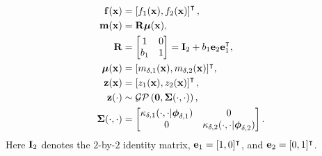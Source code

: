 \documentclass[journal ]{new-aiaa}
\begin{document}
	\begin{subequations}\label{eqn10}
		\begin{align}
			{\bf f}({\bf x}) &= \left[f_1({\bf x}),f_2({\bf x})\right]^\intercal 
			\label{eqn10-1},\\
			{\bf m}({\bf x}) &= {\bf R} \boldsymbol{\mu}({\bf x}), \label{eqn10-2}\\
			{\bf R} &= \left[\begin{matrix}
				1 & 0 \\
				b_1 & 1
			\end{matrix}\right] = {\bf I}_2 + b_1 {\bf e}_2 {\bf e}^\intercal_1, \label{eqn10-3}\\
			\boldsymbol{\mu}({\bf x}) & = [m_{\delta,1}({\bf x}),m_{\delta,2}({\bf x})]^\intercal,
			\label{eqn10-4}\\
			{\bf z}({\bf x}) & = \left[z_1({\bf x}),z_2({\bf x})\right]^\intercal, \label{eqn10-5}\\
			{\bf z}(\cdot) & \sim \mathcal{GP}\left({\bf 0},{\boldsymbol \Sigma}(\cdot,\cdot)\right),
			\label{eqn10-6}\\
			{\boldsymbol \Sigma}(\cdot,\cdot) & = \left[\begin{matrix}
				\kappa_{\delta,1}(\cdot,\cdot|{\boldsymbol \phi}_{\delta,1}) & 0 \\
				0 & \kappa_{\delta,2}(\cdot,\cdot|{\boldsymbol \phi}_{\delta,2})
			\end{matrix}\right] \label{eqn10-7}.
		\end{align}
	\end{subequations}
	Here ${\bf I}_2$ denotes the $2$-by-$2$ identity matrix, ${\bf e}_1 = [1,0]^\intercal$, and ${\bf e}_2 = [0,1]^\intercal$. 
	
\end{document}
